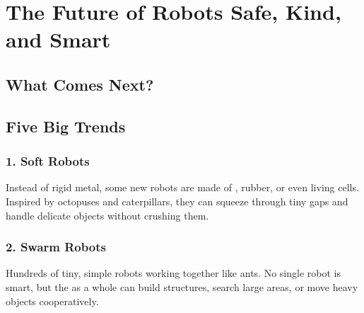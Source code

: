 
\chapter{The Future of Robots \textemdash{} Safe, Kind, and Smart}


\section*{What Comes Next?}


\sectionrule

\section*{Five Big Trends}

\subsection*{1. Soft Robots}

Instead of rigid metal, some new robots are made of , rubber,
or even living cells. Inspired by octopuses and caterpillars, they can
squeeze through tiny gaps and handle delicate objects without crushing them.

\subsection*{2. Swarm Robots}

Hundreds of tiny, simple robots working together like ants. No single robot
is smart, but the  as a whole can build structures, search large areas,
or move heavy objects cooperatively.

